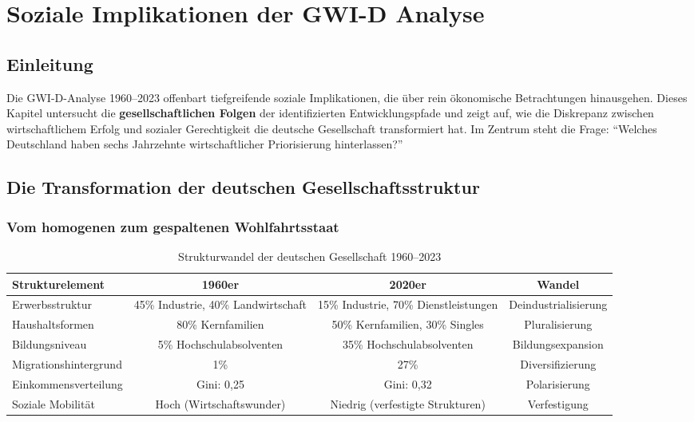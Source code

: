 \chapter{Soziale Implikationen der GWI-D Analyse}
\label{chap:soziale_implikationen}

\section*{Einleitung}
Die GWI-D-Analyse 1960–2023 offenbart tiefgreifende soziale Implikationen, die über rein ökonomische Betrachtungen hinausgehen. Dieses Kapitel untersucht die \textbf{gesellschaftlichen Folgen} der identifizierten Entwicklungspfade und zeigt auf, wie die Diskrepanz zwischen wirtschaftlichem Erfolg und sozialer Gerechtigkeit die deutsche Gesellschaft transformiert hat. Im Zentrum steht die Frage: \enquote{Welches Deutschland haben sechs Jahrzehnte wirtschaftlicher Priorisierung hinterlassen?}

\section{Die Transformation der deutschen Gesellschaftsstruktur}

\subsection{Vom homogenen zum gespaltenen Wohlfahrtsstaat}

\begin{table}[ht]
    \centering
    \caption{Strukturwandel der deutschen Gesellschaft 1960–2023}
    \label{tab:strukturwandel_gesellschaft}
    \begin{tabular}{lccc}
        \toprule
        \textbf{Strukturelement} & \textbf{1960er} & \textbf{2020er} & \textbf{Wandel} \\
        \midrule
        Erwerbsstruktur & 45\% Industrie, 40\% Landwirtschaft & 15\% Industrie, 70\% Dienstleistungen & Deindustrialisierung \\
        Haushaltsformen & 80\% Kernfamilien & 50\% Kernfamilien, 30\% Singles & Pluralisierung \\
        Bildungsniveau & 5\% Hochschulabsolventen & 35\% Hochschulabsolventen & Bildungsexpansion \\
        Migrationshintergrund & 1\% & 27\% & Diversifizierung \\
        Einkommensverteilung & Gini: 0,25 & Gini: 0,32 & Polarisierung \\
        Soziale Mobilität & Hoch (Wirtschaftswunder) & Niedrig (verfestigte Strukturen) & Verfestigung \\
        \bottomrule
    \end{tabular}
\end{table}

